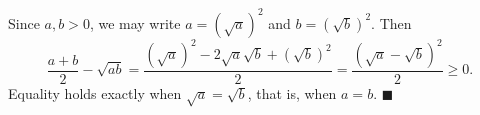 Since $a,b>0$, we may write $a=\left(\sqrt a\right)^2$ and $b=\left(\sqrt b\right)^2$. Then
\[\dfrac{a+b}{2}-\sqrt{ab}=\dfrac{\left(\sqrt a\right)^2-2\sqrt a\sqrt b+\left(\sqrt b\right)^2}{2}=\dfrac{\left(\sqrt a-\sqrt b\right)^2}{2}\ge0.\]
Equality holds exactly when $\sqrt a=\sqrt b$, that is, when $a=b$. $\blacksquare$
